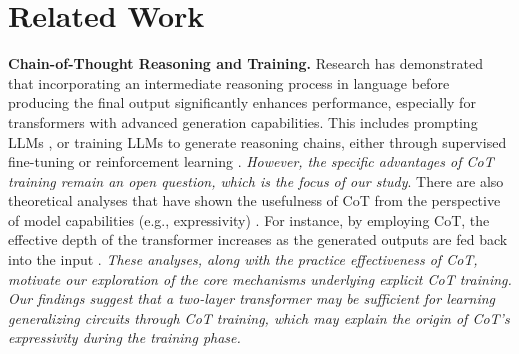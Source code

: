\section{Related Work}
\textbf{Chain-of-Thought Reasoning and Training.} Research has demonstrated that incorporating an intermediate reasoning process in language before producing the final output significantly enhances performance, especially for transformers \citep{vaswani2017attention} with advanced generation capabilities. This includes prompting LLMs \citep{wei2022chain,zhou2023leasttomost,khot2023decomposedpromptingmodularapproach}, or training LLMs to generate reasoning chains, either through supervised fine-tuning \citep{yue2023mammothbuildingmathgeneralist,yu2024metamath} or reinforcement learning \citep{wang-etal-2024-math,havrilla2024teaching,shao2024deepseekmathpushinglimitsmathematical,yu2024flowreasoningtrainingllmsdivergent}. \textit{However, the specific advantages of CoT training remain an open question, which is the focus of our study}. There are also theoretical analyses that have shown the usefulness of CoT from the perspective of model capabilities (e.g., expressivity) \citep{feng2023towards,merrill2024expressivepowertransformerschain,li2024chain,prabhakar2024decipheringfactorsinfluencingefficacy,yin2025enhancinggeneralizationchainthought}. For instance, by employing CoT, the effective depth of the transformer increases as the generated outputs are fed back into the input \citep{feng2023towards}. \textit{These analyses, along with the practice effectiveness of CoT, motivate our exploration of the core mechanisms underlying explicit CoT training. Our findings suggest that a two-layer transformer may be sufficient for learning generalizing circuits through CoT training, which may explain the origin of CoT's expressivity during the training phase.}

